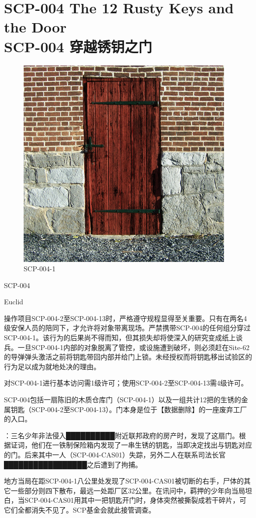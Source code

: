 \chapter[SCP-004 穿越锈钥之门]{
	SCP-004 The 12 Rusty Keys and the Door\\
	SCP-004 穿越锈钥之门
}

\label{chap:SCP-004}

\begin{figure}[H]
	\centering
	\includegraphics[width=0.5\linewidth]{images/SCP.004.jpg}
	\caption*{SCP-004-1}
\end{figure}

SCP-004

Euclid

操作项目SCP-004-2至SCP-004-13时，严格遵守规程显得至关重要。只有在两名4级安保人员的陪同下，才允许将对象带离现场。严禁携带SCP-004的任何组分穿过SCP-004-1。该行为的后果尚不得而知，但其损失却将使深入的研究变成纸上谈兵。一旦SCP-004-1内部的对象脱离了管控，或设施遭到破坏，则必须赶在Site-62的导弹弹头激活之前将钥匙带回内部并给门上锁。未经授权而将钥匙移出试验区的行为足以成为就地处决的理由。

对SCP-004-1进行基本访问需1级许可；使用SCP-004-2至SCP-004-13需4级许可。

SCP-004包括一扇陈旧的木质仓库门（SCP-004-1）以及一组共计12把的生锈的金属钥匙（SCP-004-2至SCP-004-13）。门本身是位于【数据删除】的一座废弃工厂的入口。


：三名少年非法侵入██████████附近联邦政府的房产时，发现了这扇门。根据证词，他们在一铁制保险箱内发现了一串生锈的钥匙，当即决定找出与钥匙对应的门。后来其中一人（SCP-004-CAS01）失踪，另外二人在联系司法长官█████████████████之后遭到了拘捕。

地方当局在距SCP-004-1八公里处发现了SCP-004-CAS01被切断的右手，尸体的其它一些部分则四下散布，最远一处距厂区32公里。在讯问中，羁押的少年向当局坦白，当SCP-004-CAS01用其中一把钥匙开门时，身体突然被撕裂成若干碎片，可它们全都消失不见了。SCP基金会就此接管调查。

